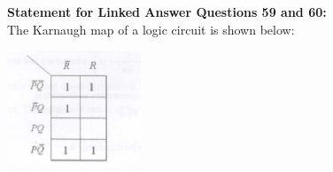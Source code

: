 \documentclass[14pt, a4paper]{extarticle}
\begin{document}
\vspace{1.5em}
\noindent
\textbf{Statement for Linked Answer Questions 59 and 60:} \\
The Karnaugh map of a logic circuit is shown below:
    \begin{center}
        \includegraphics[width=0.3\textwidth]{figs/Q59-60fig.png}
        \label{fig:q59-60}
    \end{center}
\end{document}
